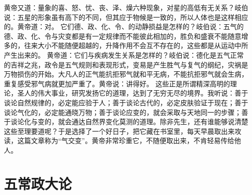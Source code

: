 \documentclass[a4paper,12pt,UTF8,twoside]{ctexbook}
\begin{document}
黄帝又道：量象的喜、怒、忧、丧、泽、燥六种现象，对星的高低有无关系？岐伯说：五星的形象虽有高下的不同，但其应于物候是一致的，所以人体也是这样相应的。黄帝道：对。
它们德、政、化、令、的动静损益是怎样的？岐伯说：五气的德、政、化、令与灾变都是有一定规律而不能彼此相加的，胜负和盛衰不能随意增多的，往来大小不能随便超越的，升降作用不会互不存在的，这些都是从运动中所产生出来的。
黄帝道：它们与疾病发生关系是怎样的？岐伯说：德化是五气正常的吉祥之兆，政令是五气规则和表现形式，变易是产生胜气与复气的纲纪，灾祸是万物损伤的开始。大凡人的正气能抗拒邪气就和平无病，不能抗拒邪气就会生病，重复感受邪气病就更加严重了。黄帝说：讲得好。
这些正是所谓精深高明的理论，圣人的伟大事业，研究发扬它的道理，达到了无穷无尽的境界。我听说：善于谈论自然规律的，必定能应验于人；善于谈论古代的，必定皮肤验证于现在；善于谈论气化的，必定能通晓万物；善于谈论应变的，就会采取与天地同一的步骤；善于谈论化与变的，就会通达自然界变化莫测的道理。除非先生，还有谁能够说清楚这些至理要道呢？于是选择了一个好日子，把它藏在书室里，每天早晨取出来攻读，这篇文章称为“气交变”。黄帝非常珍重它，不随便取出来，不肯轻易传给他人。

\chapter{五常政大论}
\end{document}
